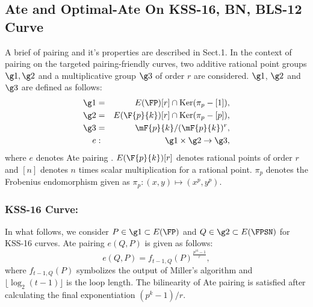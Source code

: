 \subsection{Ate and Optimal-Ate On KSS-16, BN, BLS-12 Curve}
A brief of pairing and it's properties are described in Sect.1.  
In the context of pairing on the targeted pairing-friendly curves, two additive rational point groups $\g1, \g2$ and a multiplicative group $\g3$ of order $r$ are considered. 
$\g1$, $\g2$ and $\g3$ are defined as follows:
\begin{eqnarray}\label{eq:g1}
\g1 & = &  E(\FP) [r] \cap \text{Ker}(\pi_p - [1]), \nonumber \\
\g2 & = &  E(\F{p}{k}) [r] \cap \text{Ker}(\pi_p - [p]), \nonumber \\
\g3 & = & \mF{p}{k}/(\mF{p}{k})^r, \nonumber \\
 e & : &\g1 \times \g2 \rightarrow \g3,
\end{eqnarray}
where $e$ denotes Ate pairing \cite{DBLP:reference/crc/2005ehcc}. $E(\F{p}{k})[r]$ denotes rational points of order $r$ and $[n]$ denotes $n$ times scalar multiplication for a rational point. 
$\pi_p$ denotes the Frobenius endomorphism given as $\pi_p: (x,y) \mapsto (x^p,y^p)$.

\subsubsection*{KSS-16 Curve:}
In what follows, we consider $P \in \g1 \subset E(\FP)$ and  $Q \in \g2 \subset  E(\FPSN)$ for KSS-16 curves.
Ate pairing $e(Q,P)$ is given as follows:
\begin{equation}
	e(Q,P)=f_{t-1,Q}(P)^{\frac{p^{16}-1}{r}},
\end{equation}
where $f_{t-1,Q}(P)$ symbolizes the output of Miller's algorithm and $\lfloor \log_2 (t-1) \rfloor$ is the loop length. The bilinearity of Ate pairing is satisfied after calculating the final exponentiation $(p^k-1)/r$.

